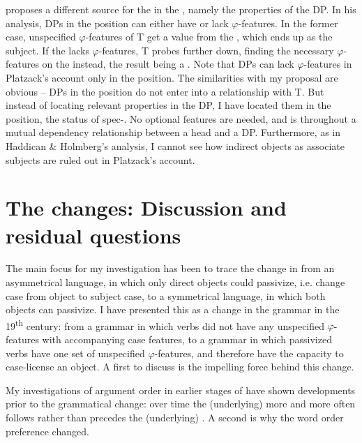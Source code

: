 \documentclass[output=paper]{langscibook}
\begin{document}
\citet{Platzack2005,Platzack2006} proposes a different source for the  in the , namely the properties of the  DP. In his analysis, DPs in the  position can either have or lack $\varphi ${}-features. In the former case, unspecified $\varphi ${}-features of T get a value from the , which ends up as the subject. If the  lacks $\varphi ${}-features, T probes further down, finding the necessary $\varphi ${}-features on the  instead, the result being a . Note that DPs can lack $\varphi ${}-features in Platzack’s account only in the  position. The similarities with my proposal are obvious – DPs in the  position do not enter into a relationship with T. But instead of locating relevant properties in the DP, I have located them in the position, the  status of spec-. No optional features are needed, and  is throughout a mutual dependency relationship between a head and a DP. Furthermore, as in Haddican \& Holmberg’s analysis, I cannot see how indirect objects as associate subjects are ruled out in Platzack’s account.


\section{The changes: Discussion and residual questions}\label{sec:falk:5}


The main focus for my investigation has been to trace the change in  from an asymmetrical language, in which only direct objects could passivize, i.e. change case from object to subject case, to a symmetrical language, in which both objects can passivize. I have presented this as a change in the grammar in the 19\textsuperscript{th} century: from a grammar in which  verbs did not have any unspecified $\varphi ${}-features with accompanying case features, to a grammar in which passivized  verbs have one set of unspecified $\varphi ${}-features, and therefore have the capacity to case-license an object. A first  to discuss is the impelling force behind this change.


My investigations of argument order in earlier stages of  have shown developments prior to the grammatical change: over time the (underlying)  more and more often follows rather than precedes the (underlying) . A second  is why the word order preference changed. 
\end{document}
